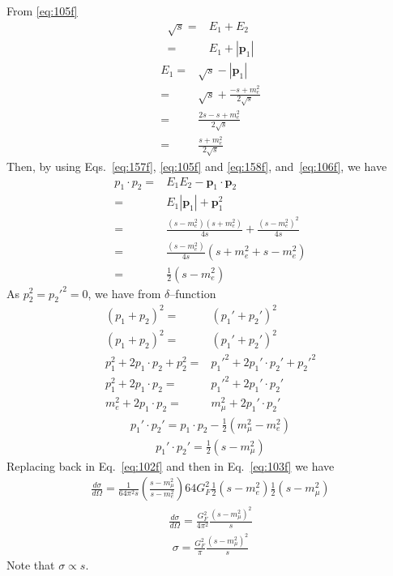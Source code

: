 From \eqref{eq:105f}
\begin{align}
  \sqrt{s}=&E_1+E_2\nonumber\\
  =&E_1+|\mathbf{p}_1|
\end{align}
\begin{align}
  \label{eq:106f}
  E_1=&\sqrt{s}-|\mathbf{p}_1|\nonumber\\
  =&\sqrt{s}+\frac{-s+m_e^2}{2\sqrt{s}}\nonumber\\
  =&\frac{2s-s+m_e^2}{2\sqrt{s}}\nonumber\\
  =&\frac{s+m_e^2}{2\sqrt{s}}
\end{align}
Then, by using Eqs.~\eqref{eq:157f}, \eqref{eq:105f} and \eqref{eq:158f}, and~\eqref{eq:106f},  we have
\begin{align}
  p_1\cdot p_2=&E_1E_2-\mathbf{p}_1\cdot\mathbf{p}_2\nonumber\\
  =&E_1|\mathbf{p}_1|+\mathbf{p}_1^2\nonumber\\
=&\frac{(s-m_e^2)(s+m_e^2)}{4s}+\frac{(s-m_e^2)^2}{4s}\nonumber\\
=&\frac{(s-m_e^2)}{4s}(s+m_e^2+s-m_e^2)\nonumber\\
=&\frac{1}{2}(s-m_e^2) 
\end{align}
As $p_2^2={p_2'}^2=0$, we have from $\delta$--function
\begin{align}
  (p_1+p_2)^2=&(p_1'+p_2')^2\nonumber\\
  (p_1+p_2)^2=&(p_1'+p_2')^2\nonumber\\
  p_1^2+2p_1\cdot p_2+p_2^2=&{p_1'}^2+2p_1'\cdot p_2'+{p_2'}^2\nonumber\\
  p_1^2+2p_1\cdot p_2=&{p_1'}^2+2p_1'\cdot p_2'\nonumber\\
  m_e^2+2p_1\cdot p_2=&m_\mu^2+2p_1'\cdot p_2'
\end{align}
\begin{align}
  p_1'\cdot p_2'=p_1\cdot p_2-\frac{1}{2}(m_\mu^2-m_e^2)
\end{align}
\begin{align}
  p_1'\cdot p_2'=\frac{1}{2}(s-m_\mu^2) 
\end{align}
Replacing back in Eq.~\eqref{eq:102f} and then in Eq.~\eqref{eq:103f} we have
\begin{align}
  \frac{d\sigma}{d\Omega}=\frac{1}{64\pi^2s}\left(\frac{s-m_\mu^2}{s-m_e^2}\right)
64G_F^2\frac{1}{2}(s-m_e^2)\frac{1}{2}(s-m_\mu^2)
\end{align} 
\begin{align}
    \frac{d\sigma}{d\Omega}=\frac{G_F^2}{4\pi^2}\frac{(s-m_\mu^2)^2}{s}
\end{align}
\begin{align}
\sigma  =\frac{G_F^2}{\pi}\frac{(s-m_\mu^2)^2}{s}
\end{align}
Note that $\sigma\propto s$.


